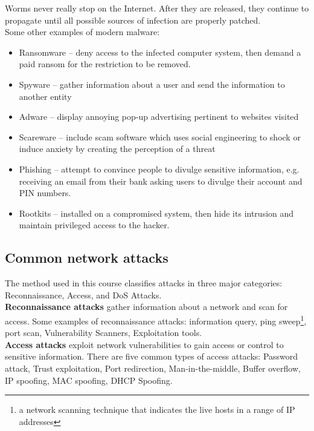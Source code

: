 \note Worms never really stop on the Internet. After they are released, they continue to propagate until all possible sources of infection are properly patched.\\

Some other examples of modern malware:

\begin{itemize}
\item Ransomware -- deny access to the infected computer system, then demand a paid ransom for the restriction to be removed.
\item Spyware -- gather information about a user and send the information to another entity
\item Adware -- display annoying pop-up advertising pertinent to websites visited
\item Scareware -- include scam software which uses social engineering to shock or induce anxiety by creating the perception of a threat
\item Phishing -- attempt to convince people to divulge sensitive information, e.g. receiving an email from their bank asking users to divulge their account and PIN numbers.
\item Rootkits -- installed on a compromised system, then hide its intrusion and maintain privileged access to the hacker.
\end{itemize}

\subsection{Common network attacks}

The method used in this course classifies attacks in three major categories: Reconnaissance, Access, and DoS Attacks.\\

\textbf{Reconnaissance attacks} gather information about a network and scan for access. Some examples of reconnaissance attacks:  information query, ping sweep\footnote{a network scanning technique that indicates the live hosts in a range of IP addresses},  port scan,  Vulnerability Scanners,  Exploitation tools.\\

\textbf{Access attacks} exploit network vulnerabilities to gain access or control to sensitive information. There are five common types of access attacks: Password attack, Trust exploitation, Port redirection, Man-in-the-middle, Buffer overflow, IP spoofing, MAC spoofing, DHCP Spoofing.\\

